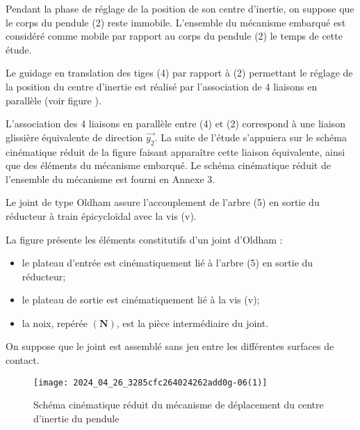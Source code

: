 Pendant la phase de réglage de la position de son centre d'inertie, on suppose que le corps du pendule (2) reste immobile. L'ensemble du mécanisme embarqué est considéré comme mobile par rapport au corps du pendule (2) le temps de cette étude.

Le guidage en translation des tiges (4) par rapport à (2) permettant le réglage de la position du centre d'inertie est réalisé par l'association de 4 liaisons en parallèle (voir figure \label{ccmp2023_fig_05}).




L'association des 4 liaisons en parallèle entre (4) et (2) correspond à une liaison glissière équivalente de direction $\overrightarrow{y_{2}}$. La suite de l'étude s'appuiera sur le schéma cinématique réduit de la figure \label{ccmp2023_fig_06} faisant apparaître cette liaison équivalente, ainsi que des éléments du mécanisme embarqué. Le schéma cinématique réduit de l'ensemble du mécanisme est fourni en Annexe 3.

Le joint de type Oldham assure l'accouplement de l'arbre (5) en sortie du réducteur à train épicycloïdal avec la vis (v).

La figure \label{ccmp2023_fig_07} présente les éléments constitutifs d'un joint d'Oldham :

\begin{itemize}
  \item le plateau d'entrée est cinématiquement lié à l'arbre (5) en sortie du réducteur;
  \item le plateau de sortie est cinématiquement lié à la vis (v);
  \item la noix, repérée $(\mathbf{N})$, est la pièce intermédiaire du joint.
\end{itemize}

On suppose que le joint est assemblé sans jeu entre les différentes surfaces de contact.

\begin{figure}[!h]
\centering
\texttt{[image: 2024\_04\_26\_3285cfc264024262add0g-06(1)]}
\caption{\label{ccmp2023_fig_06} Schéma cinématique réduit du mécanisme de déplacement du centre d'inertie du pendule}
\end{figure}

